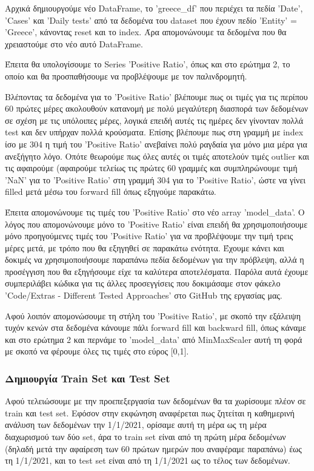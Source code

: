 \documentclass[12pt,a4paper]{article}
\begin{document}
Αρχικά δημιουργούμε νέο DataFrame, το 'greece\_df' που περιέχει τα πεδία 'Date', 'Cases' και 'Daily tests' από τα δεδομένα του dataset που έχουν πεδίο 'Entity' = 'Greece', κάνοντας reset και το index. Άρα απομονώνουμε τα δεδομένα που θα χρειαστούμε στο νέο αυτό DataFrame.

Έπειτα θα υπολογίσουμε το Series 'Positive Ratio', όπως και στο ερώτημα 2, το οποίο και θα προσπαθήσουμε να προβλέψουμε με τον παλινδρομητή.

Βλέποντας τα δεδομένα για το 'Positive Ratio' βλέπουμε πως οι τιμές για τις περίπου 60 πρώτες μέρες ακολουθούν κατανομή με πολύ μεγαλύτερη διασπορά των δεδομένων σε σχέση με τις υπόλοιπες μέρες, λογικά επειδή αυτές τις ημέρες δεν γίνονταν πολλά test και δεν υπήρχαν πολλά κρούσματα. Επίσης βλέπουμε πως στη γραμμή με index ίσο με 304 η τιμή του 'Positive Ratio' ανεβαίνει πολύ ραγδαία για μόνο μια μέρα για ανεξήγητο λόγο. Οπότε θεωρούμε πως όλες αυτές οι τιμές αποτελούν τιμές outlier και τις αφαιρούμε (αφαιρούμε τελείως τις πρώτες 60 γραμμές και συμπληρώνουμε τιμή 'NaN' για το 'Positive Ratio' στη γραμμή 304 για το 'Positive Ratio', ώστε να γίνει filled μετά μέσω του forward fill όπως εξηγούμε παρακάτω.

Έπειτα απομονώνουμε τις τιμές του 'Positive Ratio' στο νέο array 'model\_data'. Ο λόγος που απομονώνουμε μόνο το 'Positive Ratio' είναι επειδή θα χρησιμοποιήσουμε μόνο προηγούμενες τιμές του 'Positive Ratio' για να προβλέψουμε την τιμή τρεις μέρες μετά, με τρόπο που θα εξηγηθεί σε παρακάτω ενότητα. Έχουμε κάνει και δοκιμές να χρησιμοποιήσουμε παραπάνω πεδία δεδομένων για την πρόβλεψη, αλλά η προσέγγιση που θα εξηγήσουμε είχε τα καλύτερα αποτελέσματα. Παρόλα αυτά έχουμε συμπεριλάβει κώδικα για τις άλλες προσεγγίσεις που δοκιμάσαμε στον φάκελο 'Code/Extras - Different Tested Approaches' στο GitHub της εργασίας μας.

Αφού λοιπόν απομονώσουμε τη στήλη του 'Positive Ratio', με σκοπό την εξάλειψη τυχόν κενών στα δεδομένα κάνουμε πάλι forward fill και backward fill, όπως κάναμε και στο ερώτημα 2 και περνάμε το 'model\_data' από MinMaxScaler αυτή τη φορά με σκοπό να φέρουμε όλες τις τιμές στο εύρος [0,1].

\subsubsection{Δημιουργία Train Set και Test Set}

Αφού τελειώσουμε με την προεπεξεργασία των δεδομένων θα τα χωρίσουμε πλέον σε train και test set. Εφόσον στην εκφώνηση αναφέρεται πως ζητείται η καθημερινή ανάλυση των δεδομένων την 1/1/2021, ορίσαμε αυτή τη μέρα ως τη μέρα διαχωρισμού των δύο set, άρα το train set είναι από τη πρώτη μέρα δεδομένων (δηλαδή μετά την αφαίρεση των 60 πρώτων ημερών που αναφέραμε παραπάνω) έως τη 1/1/2021, και το test set είναι από τη 1/1/2021 ως το τέλος των δεδομένων.
\end{document}
